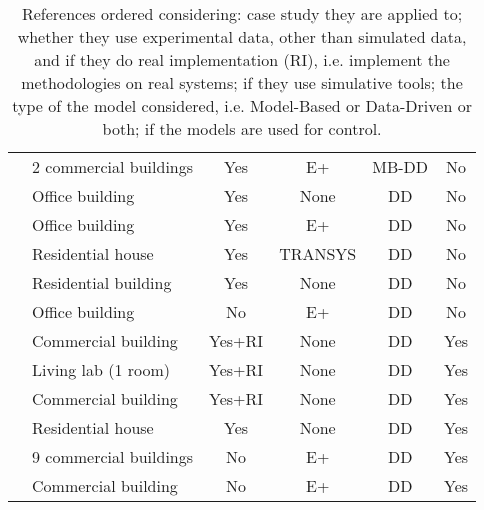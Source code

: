 {\begin{table}[t!]
{\begin{tabular}{llcccc}
		\cite{Li2016AE}                  & 2 commercial buildings  & Yes                 & E+                  & MB-DD             & No                \\
		\cite{Safa2017SCS}               & Office building         & Yes                 & None                & DD                & No                \\
		\cite{Neto2008EB}                & Office building         & Yes                 & E+                  & DD                & No                \\
		\cite{Magnier2010BE}             & Residential house       & Yes                 & TRANSYS             & DD                & No                \\
		\cite{Candanedo2017EB}           & Residential building    & Yes                 & None                & DD                & No                \\
		\cite{Ascione2017E}              & Office building         & No                  & E+                  & DD                & No                \\
		\cite{Macarulla2017}             & Commercial building     & Yes+RI              & None                & DD                & Yes               \\
		\cite{Costanzo2016}              & Living lab (1 room)     & Yes+RI              & None                & DD                & Yes               \\
		\cite{Ferreira2012}              & Commercial building     & Yes+RI              & None                & DD                & Yes               \\
		\cite{Afram2017}                 & Residential house       & Yes                 & None                & DD                & Yes               \\
		\cite{Behl2016}                  & 9 commercial buildings  & No                  & E+                  & DD                & Yes               \\
		\cite{Jain2017TCPS}              & Commercial building     & No                  & E+                  & DD                & Yes               \\
		\bottomrule
	\end{tabular}\normalsize}
	\caption{\textcolor[rgb]{0,0,1}{References ordered considering: case study they are applied to; whether they use experimental data, other than simulated data, and if they do real implementation (RI), i.e. implement the methodologies on real systems; if they use simulative tools; the type of the model considered, i.e. Model-Based or Data-Driven or both; if the models are used for control.}}
	\captionsetup{justification=centering}
	\label{T:RelatedWork}
\end{table}
}

